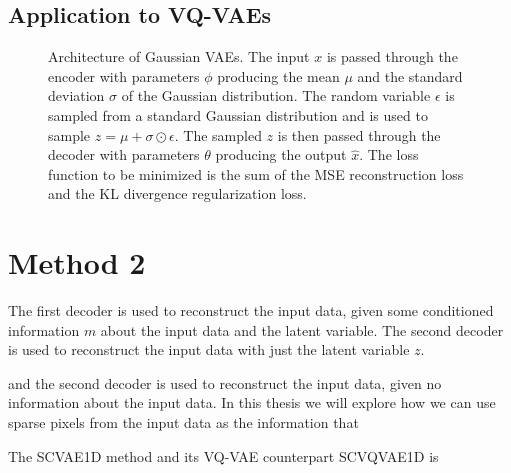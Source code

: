 \subsection{Application to VQ-VAEs}

\begin{figure}[H]
    \centering 
    
    \caption[Architecture of SCVAE1D.]%
    { 
        Architecture of Gaussian VAEs. The input $x$ is passed through the encoder with parameters $\phi$ producing the mean $\mu$ and the standard deviation $\sigma$ of the Gaussian distribution. The random variable $\epsilon$ is sampled from a standard Gaussian distribution and is used to sample $ z = \mu + \sigma \odot \epsilon$. The sampled $z$ is then passed through the decoder with parameters $\theta$ producing the output $\hat{x}$. The loss function to be minimized is the sum of the MSE reconstruction loss and the KL divergence regularization loss. 
    }\label{SCVQVAE1DFigure}
\end{figure}

\section{Method 2}


The first decoder is used to reconstruct the input data, given some conditioned information $m$ about the input data and the latent variable. The second decoder is used to reconstruct the input data with just the latent variable $z$.

and the second decoder is used to reconstruct the input data, given no information about the input data. In this thesis we will explore how we can use sparse pixels from the input data as the information that 

The SCVAE1D method and its VQ-VAE counterpart SCVQVAE1D is 





